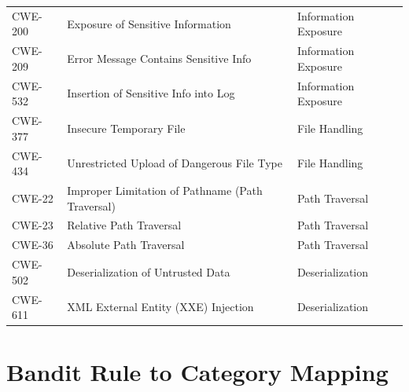 \documentclass[12pt,a4paper]{report}
\begin{document}
\begin{longtable}{@{}lll@{}}
CWE-200 & Exposure of Sensitive Information                & Information Exposure \\
CWE-209 & Error Message Contains Sensitive Info            & Information Exposure \\
CWE-532 & Insertion of Sensitive Info into Log             & Information Exposure \\
CWE-377 & Insecure Temporary File                          & File Handling \\
CWE-434 & Unrestricted Upload of Dangerous File Type       & File Handling \\
CWE-22  & Improper Limitation of Pathname (Path Traversal) & Path Traversal \\
CWE-23  & Relative Path Traversal                          & Path Traversal \\
CWE-36  & Absolute Path Traversal                          & Path Traversal \\
CWE-502 & Deserialization of Untrusted Data                & Deserialization \\
CWE-611 & XML External Entity (XXE) Injection              & Deserialization \\
\end{longtable}

\chapter{Bandit Rule to Category Mapping}
\label{app:banditmap}
\end{document}
